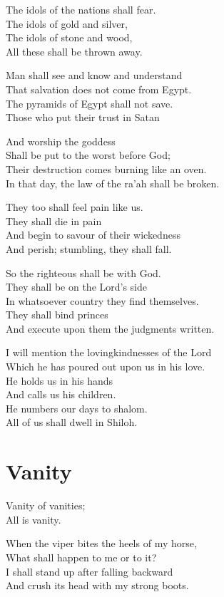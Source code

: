 \documentclass[
]{book}
\begin{document}
The idols of the nations shall fear.\\
The idols of gold and silver,\\
The idols of stone and wood,\\
All these shall be thrown away.

Man shall see and know and understand\\
That salvation does not come from Egypt.\\
The pyramids of Egypt shall not save.\\
Those who put their trust in Satan

And worship the goddess\\
Shall be put to the worst before God;\\
Their destruction comes burning like an oven.\\
In that day, the law of the ra'ah shall be broken.

They too shall feel pain like us.\\
They shall die in pain\\
And begin to savour of their wickedness\\
And perish; stumbling, they shall fall.

So the righteous shall be with God.\\
They shall be on the Lord's side\\
In whatsoever country they find themselves.\\
They shall bind princes\\
And execute upon them the judgments written.

I will mention the lovingkindnesses of the Lord\\
Which he has poured out upon us in his love.\\
He holds us in his hands\\
And calls us his children.\\
He numbers our days to shalom.\\
All of us shall dwell in Shiloh.

\chapter{Vanity}\label{vanity}

Vanity of vanities;\\
All is vanity.

When the viper bites the heels of my horse,\\
What shall happen to me or to it?\\
I shall stand up after falling backward\\
And crush its head with my strong boots.
\end{document}
